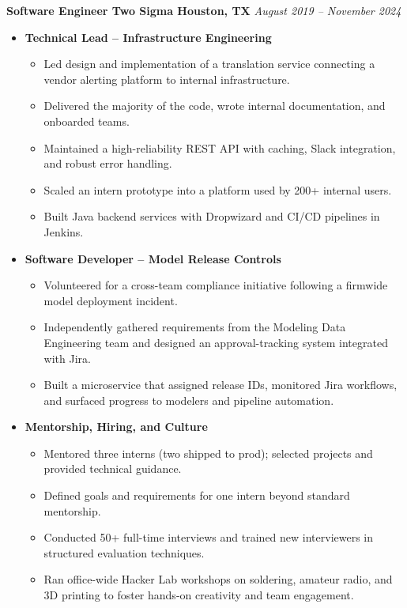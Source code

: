 \documentclass[11pt]{article}
\begin{document}
\newcommand{\sectionentry}[2]{\textbf{#1} \hfill \emph{#2}}
\newcommand{\roleentry}[1]{\item \textbf{#1}}
\newenvironment{role}[1]{
  \roleentry{#1}
  \begin{itemize}
}{
  \end{itemize}
}

\sectionentry{Software Engineer \textbar{} Two Sigma \textbar{} Houston, TX}{August 2019 -- November 2024}
\begin{itemize}
  \begin{role}{Technical Lead – Infrastructure Engineering}
    \item Led design and implementation of a translation service connecting a vendor alerting platform to internal infrastructure.
    \item Delivered the majority of the code, wrote internal documentation, and onboarded teams.
    \item Maintained a high-reliability REST API with caching, Slack integration, and robust error handling.
    \item Scaled an intern prototype into a platform used by 200+ internal users.
    \item Built Java backend services with Dropwizard and CI/CD pipelines in Jenkins.
  \end{role}

  \begin{role}{Software Developer – Model Release Controls}
    \item Volunteered for a cross-team compliance initiative following a firmwide model deployment incident.
    \item Independently gathered requirements from the Modeling Data Engineering team and designed an approval-tracking system integrated with Jira.
    \item Built a microservice that assigned release IDs, monitored Jira workflows, and surfaced progress to modelers and pipeline automation.
  \end{role}

  \begin{role}{Mentorship, Hiring, and Culture}
    \item Mentored three interns (two shipped to prod); selected projects and provided technical guidance.
    \item Defined goals and requirements for one intern beyond standard mentorship.
    \item Conducted 50+ full-time interviews and trained new interviewers in structured evaluation techniques.
    \item Ran office-wide Hacker Lab workshops on soldering, amateur radio, and 3D printing to foster hands-on creativity and team engagement.
  \end{role}


\end{itemize}
\end{document}

